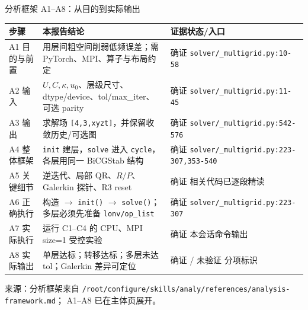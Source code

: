 \documentclass[UTF8,aspectratio=169,11pt]{ctexbeamer}
\newcommand{\source}[1]{%
  \vspace{0.06em}\par{\raggedright\scriptsize\color{muted}来源：#1\par}}
\newcommand{\pathref}[1]{\nolinkurl{#1}}
\newcommand{\verified}{\textcolor{evidence}{确证}}
\newcommand{\unverified}{\textcolor{warn}{未验证}}
\begin{document}
\begin{frame}[t]{分析框架 A1--A8：从目的到实际输出}
  \begin{center}
    \scriptsize
    \begin{tabular}{@{}P{0.12\textwidth}P{0.62\textwidth}P{0.20\textwidth}@{}}
      \toprule
      步骤 & 本报告结论 & 证据状态/入口 \\
      \midrule
      A1 目的与前置 & 用层间粗空间削弱低频误差；需 PyTorch、MPI、算子与布局约定 & \verified{} \pathref{solver/_multigrid.py:10-58} \\
      A2 输入 & $U,C,\kappa,u_0$、层级尺寸、dtype/device、tol/max\_iter、可选 parity & \verified{} \pathref{solver/_multigrid.py:11-45} \\
      A3 输出 & 求解场 \texttt{[4,3,xyzt]}，并保留收敛历史/可选图 & \verified{} \pathref{solver/_multigrid.py:542-576} \\
      A4 整体框架 & \texttt{init} 建层，\texttt{solve} 进入 \texttt{cycle}，各层用同一 BiCGStab 结构 & \verified{} \pathref{solver/_multigrid.py:223-307,353-540} \\
      A5 关键细节 & 逆迭代、局部 QR、$R/P$、Galerkin 探针、R3 reset & \verified{} 相关代码已逐段精读 \\
      A6 正确执行 & 构造 $\to$ \texttt{init()} $\to$ \texttt{solve()}；多层必须先准备 \texttt{lonv/op\_list} & \verified{} \pathref{solver/_multigrid.py:223-307} \\
      A7 实际执行 & 运行 C1--C4 的 CPU、MPI size=1 受控实验 & \verified{} 本会话命令输出 \\
      A8 实际输出 & 单层达标；转移达标；多层未达 tol；Galerkin 差异可定位 & \verified{} / \unverified{} 分项标识 \\
      \bottomrule
    \end{tabular}
  \end{center}
  \source{分析框架来自 \pathref{/root/configure/skills/analy/references/analysis-framework.md}；
  A1--A8 已在主体页展开。}
\end{frame}
\end{document}
